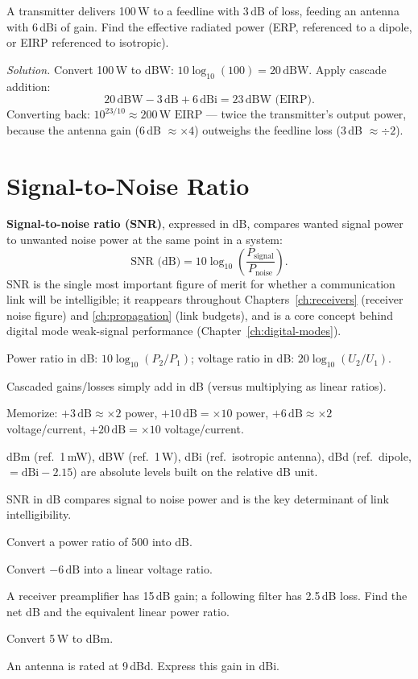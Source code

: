 \begin{examplebox}
A transmitter delivers 100\,W to a feedline with 3\,dB of loss, feeding
an antenna with 6\,dBi of gain. Find the effective radiated power (ERP,
referenced to a dipole, or EIRP referenced to isotropic).

\emph{Solution.} Convert 100\,W to dBW: $10\log_{10}(100) =
20\,\text{dBW}$. Apply cascade addition:
\[
20\,\text{dBW} - 3\,\text{dB} + 6\,\text{dBi} = 23\,\text{dBW (EIRP)}.
\]
Converting back: $10^{23/10} \approx 200\,\text{W EIRP}$ --- twice the
transmitter's output power, because the antenna gain (6\,dB $\approx
\times4$) outweighs the feedline loss (3\,dB $\approx \div2$).
\end{examplebox}

\section{Signal-to-Noise Ratio}

\textbf{Signal-to-noise ratio (SNR)}, expressed in dB, compares wanted
signal power to unwanted noise power at the same point in a system:
\[
\text{SNR (dB)} = 10\log_{10}\!\left(\frac{P_{\text{signal}}}{P_{\text{noise}}}\right).
\]
SNR is the single most important figure of merit for whether a
communication link will be intelligible; it reappears throughout
Chapters~\ref{ch:receivers} (receiver noise figure) and
\ref{ch:propagation} (link budgets), and is a core concept behind
digital mode weak-signal performance (Chapter~\ref{ch:digital-modes}).

\begin{quickreview}
\item Power ratio in dB: $10\log_{10}(P_2/P_1)$; voltage ratio in dB:
$20\log_{10}(U_2/U_1)$.
\item Cascaded gains/losses simply add in dB (versus multiplying as
linear ratios).
\item Memorize: $+3\,\text{dB} \approx \times2$ power,
$+10\,\text{dB} = \times10$ power, $+6\,\text{dB} \approx \times2$
voltage/current, $+20\,\text{dB} = \times10$ voltage/current.
\item dBm (ref.\ 1\,mW), dBW (ref.\ 1\,W), dBi (ref.\ isotropic
antenna), dBd (ref.\ dipole, $= \text{dBi} - 2.15$) are absolute levels
built on the relative dB unit.
\item SNR in dB compares signal to noise power and is the key
determinant of link intelligibility.
\end{quickreview}

\begin{practiceproblems}
\item Convert a power ratio of 500 into dB.
\item Convert $-6\,\text{dB}$ into a linear voltage ratio.
\item A receiver preamplifier has 15\,dB gain; a following filter has
2.5\,dB loss. Find the net dB and the equivalent linear power ratio.
\item Convert 5\,W to dBm.
\item An antenna is rated at 9\,dBd. Express this gain in dBi.
\end{practiceproblems}
